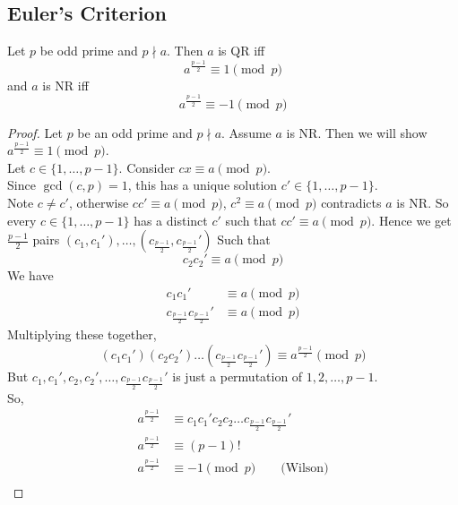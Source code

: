     \subsection{Euler's Criterion}
    \begin{theorem} 
        Let $p$ be odd prime and $p\nmid a$. Then $a$ is QR iff 
        \[ a^{\frac{p-1}{2}}\equiv 1\pmod{p} \]
        and $a$ is NR iff
        \[ a^{\frac{p-1}{2}}\equiv -1\pmod{p} \]
        \begin{proof}
            Let $p$ be an odd prime and $p\nmid a$. Assume $a$ is NR. 
            Then we will show $a^{\frac{p-1}{2}}\equiv 1\pmod{p}$. \\
            Let $c\in\{1,\dots,p-1\}$. Consider $cx\equiv a\pmod{p}$. \\
            Since $\gcd(c,p)=1$, this has a unique solution $c'\in\{1,\dots,p-1\}$. \\
            Note $c\ne c'$, otherwise $cc'\equiv a\pmod{p}$, $c^2\equiv a\pmod{p}$
            contradicts $a$ is NR. 
            So every $c\in\{1,\dots,p-1\}$ has a distinct $c'$ such that 
            $cc'\equiv a\pmod{p}$. 
            Hence we get $\frac{p-1}{2}$ pairs $(c_1, c_1'),\dots,(c_{\frac{p-1}{2}}, c_{\frac{p-1}{2}}')$
            Such that 
            \[ c_2c_2'\equiv a\pmod{p} \]
            We have 
            \begin{align*}
                c_1c_1' &\equiv a\pmod{p} \\
                c_{\frac{p-1}{2}}c_{\frac{p-1}{2}}' &\equiv a\pmod{p}
            \end{align*}
            Multiplying these together,
            \[
                (c_1c_1')(c_2c_2')\dots(c_{\frac{p-1}{2}}c_{\frac{p-1}{2}}') \equiv a^{\frac{p-1}{2}} \pmod{p}
            \]
            But $c_1,c_1',c_2,c_2',\dots,c_{\frac{p-1}{2}}c_{\frac{p-1}{2}}'$
            is just a permutation of $1,2,\dots,p-1$. \\
            So, 
            \begin{align*}
                a^{\frac{p-1}{2}} &\equiv c_1c_1'c_2c_2\dots c_{\frac{p-1}{2}}c_{\frac{p-1}{2}}' \\
                a^{\frac{p-1}{2}} &\equiv (p-1)! \\
                a^{\frac{p-1}{2}} &\equiv -1 \pmod{p} \quad\quad\text{(Wilson)}\\
            \end{align*}
        \end{proof}
    \end{theorem}

